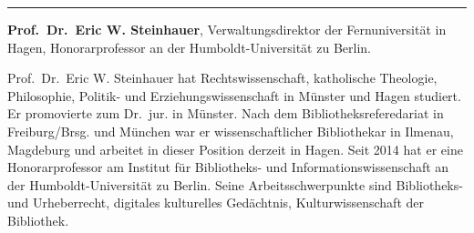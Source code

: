 \begin{center}\rule{0.5\linewidth}{\linethickness}\end{center}

\textbf{Prof.~Dr.~Eric W. Steinhauer}, Verwaltungsdirektor der
Fernuniversität in Hagen, Honorarprofessor an der Humboldt-Universität
zu Berlin.

Prof.~Dr.~Eric W. Steinhauer hat Rechtswissenschaft, katholische
Theologie, Philosophie, Politik- und Erziehungswissenschaft in Münster
und Hagen studiert. Er promovierte zum Dr.~jur. in Münster. Nach dem
Bibliotheksreferedariat in Freiburg/Brsg. und München war er
wissenschaftlicher Bibliothekar in Ilmenau, Magdeburg und arbeitet in
dieser Position derzeit in Hagen. Seit 2014 hat er eine Honorarprofessor
am Institut für Bibliotheks- und Informationswissenschaft an der
Humboldt-Universität zu Berlin. Seine Arbeitsschwerpunkte sind
Bibliotheks- und Urheberrecht, digitales kulturelles Gedächtnis,
Kulturwissenschaft der Bibliothek.
